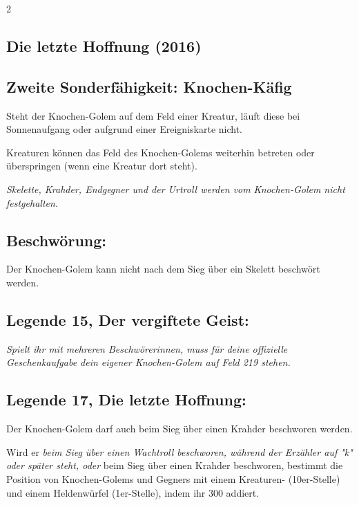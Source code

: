 \documentclass[10pt, a4paper, oneside]{book}
\newcommand{\fan}[1]{\textit{#1}}
\begin{document}
\begin{multicols*}{2}
\columnbreak



\begin{bgcolor}
\section{Die letzte Hoffnung (2016)}


\subsection{Zweite Sonderfähigkeit: Knochen-Käfig}

Steht der Knochen-Golem auf dem Feld einer Kreatur, läuft diese bei Sonnenaufgang oder aufgrund einer Ereigniskarte nicht.
\supercite{DH11:Heldenkarte_Beschwörer}

Kreaturen können das Feld des Knochen-Golems weiterhin betreten oder überspringen (wenn eine Kreatur dort steht).

\fan{Skelette, Krahder, Endgegner und der Urtroll werden vom Knochen-Golem nicht festgehalten.}




\subsection{Beschwörung:}

Der Knochen-Golem kann nicht nach dem Sieg über ein Skelett beschwört werden.
\supercite{DH:Begleitheft}



\subsection{Legende 15, Der vergiftete Geist:}

\fan{Spielt ihr mit mehreren Beschwörerinnen, muss für deine offizielle Geschenkaufgabe dein eigener Knochen-Golem auf Feld 219 stehen.}





\subsection{Legende 17, Die letzte Hoffnung:}


Der Knochen-Golem darf auch beim Sieg über einen Krahder beschworen werden. 
\supercite{DH:Begleitheft}

Wird er \fan{beim Sieg über einen Wachtroll beschworen, während der Erzähler auf "k" oder später steht, oder} beim Sieg über einen Krahder beschworen, bestimmt die Position von Knochen-Golems und Gegners mit einem Kreaturen- (10er-Stelle) und einem Heldenwürfel (1er-Stelle), indem ihr 300 addiert.


\end{bgcolor}
\end{multicols*}
\end{document}
